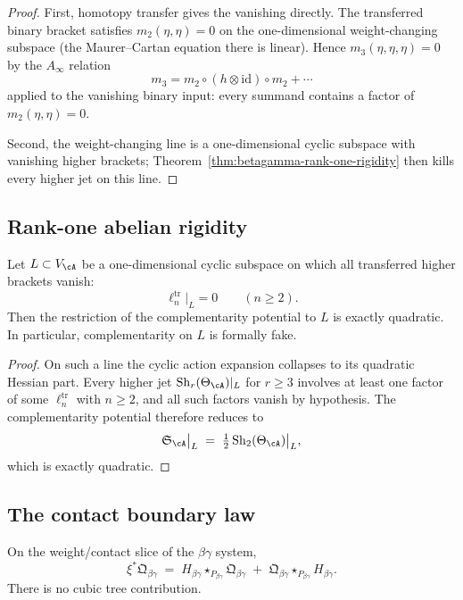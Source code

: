 \begin{proof}
First, homotopy transfer gives the vanishing directly.
The transferred binary bracket satisfies $m_2(\eta,\eta) = 0$ on the
one-dimensional weight-changing subspace (the Maurer--Cartan equation
there is linear). Hence
$m_3(\eta,\eta,\eta) = 0$ by the $A_\infty$ relation
\[
 m_3 = m_2 \circ (h \otimes \mathrm{id}) \circ m_2 + \cdots
\]
applied to the vanishing binary input: every summand contains a factor
of $m_2(\eta,\eta) = 0$.

\medskip
Second, the weight-changing line is a one-dimensional cyclic subspace
with vanishing higher brackets; Theorem~\ref{thm:betagamma-rank-one-rigidity}
then kills every higher jet on this line.\qedhere
\end{proof}

\subsection{Rank-one abelian rigidity}

\begin{theorem}
\label{thm:betagamma-rank-one-rigidity}
Let $L \subset V_{\cA}$ be a one-dimensional cyclic subspace on which
all transferred higher brackets vanish:
\[
 \ell_n^{\mathrm{tr}}\big|_L = 0
 \qquad (n \ge 2).
\]
Then the restriction of the complementarity potential to $L$ is exactly
quadratic. In particular, complementarity on $L$ is formally fake.
\end{theorem}

\begin{proof}
On such a line the cyclic action expansion collapses to its quadratic
Hessian part. Every higher jet
$\mathrm{Sh}_r(\Theta_{\cA})|_L$ for $r \ge 3$ involves at least one
factor of some $\ell_n^{\mathrm{tr}}$ with $n \ge 2$, and all such
factors vanish by hypothesis. The complementarity potential therefore
reduces to
\[
 \mathfrak{S}_{\cA}\big|_L
 \;=\;
 \tfrac{1}{2}\,\mathrm{Sh}_2(\Theta_{\cA})\big|_L,
\]
which is exactly quadratic.\qedhere
\end{proof}

\subsection{The contact boundary law}

\begin{corollary}
\label{cor:betagamma-pure-contact-boundary}
On the weight/contact slice of the $\beta\gamma$ system,
\[
 \xi^*\mathfrak{Q}_{\beta\gamma}
 \;=\;
 H_{\beta\gamma} \star_{P_{\beta\gamma}} \mathfrak{Q}_{\beta\gamma}
 \;+\;
 \mathfrak{Q}_{\beta\gamma} \star_{P_{\beta\gamma}} H_{\beta\gamma}.
\]
There is no cubic tree contribution.
\end{corollary}

